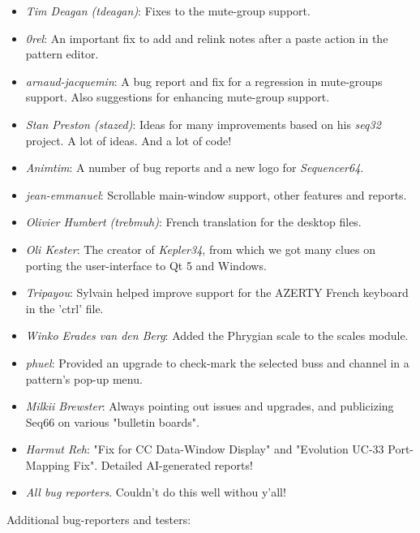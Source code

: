    \begin{itemize}
      \item \textsl{Tim Deagan (tdeagan)}:
         Fixes to the mute-group support.
      \item \textsl{0rel}:
         An important fix to add and relink notes after a
         paste action in the pattern editor.
      \item \textsl{arnaud-jacquemin}:
         A bug report and fix for a regression in mute-groups support.
         Also suggestions for enhancing mute-group support.
      \item \textsl{Stan Preston (stazed)}:
         Ideas for many improvements based
         on his \textsl{seq32} project.  A lot of ideas.
         And a lot of code!
      \item \textsl{Animtim}:
         A number of bug reports and a new logo for \textsl{Sequencer64}.
      \item \textsl{jean-emmanuel}:
         Scrollable main-window support, other features and reports.
      \item \textsl{Olivier Humbert (trebmuh)}:
         French translation for the desktop files.
      \item \textsl{Oli Kester}:
         The creator of \textsl{Kepler34}, from which we got many
         clues on porting the user-interface to Qt 5 and Windows.
      \item \textsl{Tripayou}:
         Sylvain helped improve support for the AZERTY French keyboard in the
         'ctrl' file.
      \item \textsl{Winko Erades van den Berg}:
         Added the Phrygian scale to the scales module.
      \item \textsl{phuel}:
         Provided an upgrade to check-mark the selected buss and channel
         in a pattern's pop-up menu.
      \item \textsl{Milkii Brewster}:
         Always pointing out issues and upgrades, and publicizing
         Seq66 on various "bulletin boards".
      \item \textsl{Harmut Reh}:
         "Fix for CC Data-Window Display" and
         "Evolution UC-33 Port-Mapping Fix".
         Detailed AI-generated reports!
      \item \textsl{All bug reporters}.
         Couldn't do this well withou y'all!
   \end{itemize}

   Additional bug-reporters and testers:

